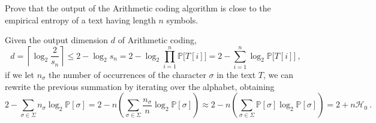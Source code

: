 \exercise

Prove that the output of the Arithmetic coding algorithm is close to the
empirical entropy of a text having length $n$ symbols.

\solution

Given the output dimension $d$ of Arithmetic coding, $$d = \left\lceil\log_2
\frac{2}{s_n} \right\rceil \le 2 - \log_2 s_n = 2 - \log_2 \prod_{i=1}^n
\mathbb{P}\big[T[i]\big] = 2 - \sum_{i = 1}^n \log_2 \mathbb{P}\big[T[i]\big]\
,$$ if we let $n_\sigma$ the number of occurrences of the character $\sigma$ in
the text $T$, we can rewrite the previous summation by iterating over the
alphabet, obtaining $$2 - \sum_{\sigma \in \Sigma}
n_\sigma\log_2\mathbb{P}[\sigma] = 2 - n\left( \sum_{\sigma \in \Sigma}
\frac{n_\sigma}{n} \log_2 \mathbb{P}[\sigma] \right) \approx 2 - n\left(
\sum_{\sigma \in \Sigma} \mathbb{P}[\sigma] \log_2 \mathbb{P}[\sigma]\right) = 2
+ n\mathcal{H}_0\ .$$
